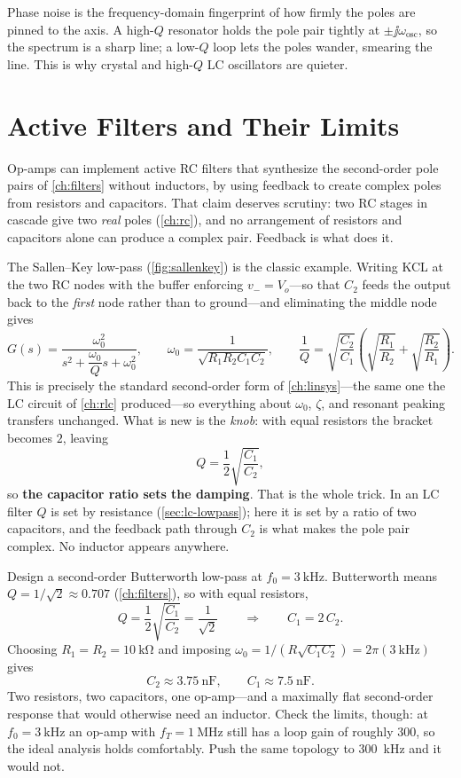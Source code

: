 \begin{physicalbox}
Phase noise is the frequency-domain fingerprint of how firmly the poles are
pinned to the axis. A high-\(Q\) resonator holds the pole pair tightly at
\(\pm\jj\omega_{\text{osc}}\), so the spectrum is a sharp line; a low-\(Q\) loop
lets the poles wander, smearing the line. This is why crystal and high-\(Q\) LC
oscillators are quieter.
\end{physicalbox}

\section{Active Filters and Their Limits}
Op-amps can implement active RC filters that synthesize the second-order pole
pairs of \cref{ch:filters} without inductors, by using feedback to create complex
poles from resistors and capacitors. That claim deserves scrutiny: two RC stages in
cascade give two \emph{real} poles (\cref{ch:rc}), and no arrangement of resistors and
capacitors alone can produce a complex pair. Feedback is what does it.

The Sallen--Key low-pass (\cref{fig:sallenkey}) is the classic example. Writing KCL at
the two RC nodes with the buffer enforcing \(v_-=V_o\)---so that \(C_2\) feeds the
output back to the \emph{first} node rather than to ground---and eliminating the middle
node gives
\[
G(s)=\frac{\omega_0^2}{s^2+\dfrac{\omega_0}{Q}s+\omega_0^2},
\qquad
\omega_0=\frac{1}{\sqrt{R_1R_2C_1C_2}},
\qquad
\frac{1}{Q}=\sqrt{\frac{C_2}{C_1}}
\left(\sqrt{\frac{R_1}{R_2}}+\sqrt{\frac{R_2}{R_1}}\right).
\]
This is precisely the standard second-order form of \cref{ch:linsys}---the same one the
LC circuit of \cref{ch:rlc} produced---so everything about \(\omega_0\), \(\zeta\), and
resonant peaking transfers unchanged. What is new is the \emph{knob}: with equal
resistors the bracket becomes \(2\), leaving
\[
Q=\frac{1}{2}\sqrt{\frac{C_1}{C_2}} ,
\]
so \textbf{the capacitor ratio sets the damping}. That is the whole trick. In an LC
filter \(Q\) is set by resistance (\cref{sec:lc-lowpass}); here it is set by a ratio of
two capacitors, and the feedback path through \(C_2\) is what makes the pole pair
complex. No inductor appears anywhere.

\begin{workedbox}
Design a second-order Butterworth low-pass at \(f_0=\SI{3}{\kilo\hertz}\).
Butterworth means \(Q=1/\sqrt2\approx0.707\) (\cref{ch:filters}), so with equal
resistors,
\[
Q=\frac{1}{2}\sqrt{\frac{C_1}{C_2}}=\frac{1}{\sqrt2}
\qquad\Longrightarrow\qquad
C_1=2\,C_2 .
\]
Choosing \(R_1=R_2=\SI{10}{\kilo\ohm}\) and imposing
\(\omega_0=1/(R\sqrt{C_1C_2})=2\pi(\SI{3}{\kilo\hertz})\) gives
\[
C_2\approx\SI{3.75}{\nano\farad},
\qquad
C_1\approx\SI{7.5}{\nano\farad}.
\]
Two resistors, two capacitors, one op-amp---and a maximally flat second-order response
that would otherwise need an inductor. Check the limits, though: at
\(f_0=\SI{3}{\kilo\hertz}\) an op-amp with \(f_T=\SI{1}{\mega\hertz}\) still has a loop
gain of roughly \(300\), so the ideal analysis holds comfortably. Push the same
topology to \SI{300}{\kilo\hertz} and it would not.
\end{workedbox}

